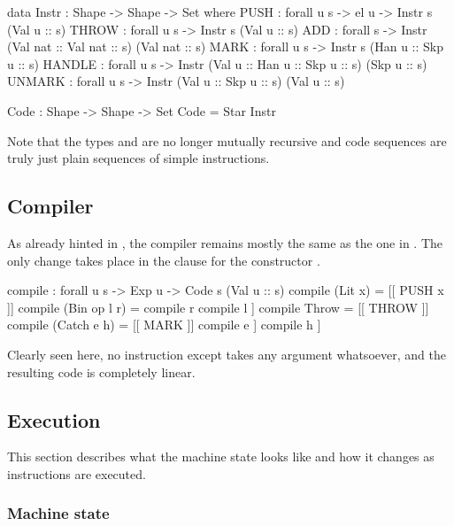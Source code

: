 \begin{code}
  data Instr : Shape -> Shape -> Set where
    PUSH : forall {u s} -> el u -> Instr s (Val u :: s)
    THROW : forall {u s} -> Instr s (Val u :: s)
    ADD : forall {s} -> Instr (Val nat :: Val nat :: s) (Val nat :: s)
    MARK : forall {u s} -> Instr s (Han u :: Skp u :: s)
    HANDLE : forall {u s} -> Instr (Val u :: Han u :: Skp u :: s) (Skp u :: s)
    UNMARK : forall {u s} -> Instr (Val u :: Skp u :: s) (Val u :: s)
\end{code}\label{sec:lin-code}
\begin{code}
  Code : Shape -> Shape -> Set
  Code = Star Instr
\end{code}
\noindent Note that the types  and  are no longer mutually recursive
and code sequences are truly just plain sequences of simple instructions.

\subsection{Compiler}

As already hinted in , the compiler remains
mostly the same as the one in . The only change takes
place in the clause for the constructor .

\label{sec:lin-compile}\begin{code}
  compile : forall {u s} -> Exp u -> Code s (Val u :: s)
  compile (Lit x) = [[ PUSH x ]]
  compile (Bin op l r) = compile r \app compile l \app [[ opInstr op ]] 
  compile Throw = [[ THROW ]]
  compile (Catch e h) =
      [[ MARK ]] \app compile e \app [[ HANDLE ]] \app compile h \app [[ UNMARK ]]
\end{code}

Clearly seen here, no instruction except  takes any argument whatsoever,
and the resulting code is completely linear.

\subsection{Execution}

This section describes what the machine state looks like and how it changes as
instructions are executed.

\subsubsection{Machine state}\label{sec:lin-machine-state}

